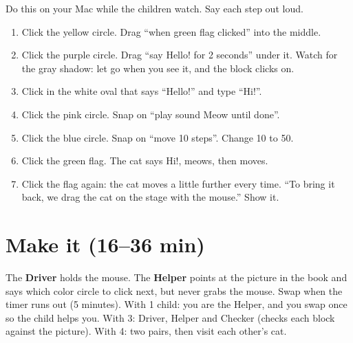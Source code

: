\begin{workedexample}
Do this on your Mac while the children watch. Say each step out loud.
\begin{enumerate}[leftmargin=1.4em,itemsep=1pt]
  \item Click the yellow  circle. Drag \enquote{when green flag clicked} into the middle.
  \item Click the purple  circle. Drag \enquote{say Hello! for 2 seconds} under it. Watch for the gray shadow: let go when you see it, and the block clicks on.
  \item Click in the white oval that says \enquote{Hello!} and type \enquote{Hi!}.
  \item Click the pink  circle. Snap on \enquote{play sound Meow until done}.
  \item Click the blue  circle. Snap on \enquote{move 10 steps}. Change 10 to 50.
  \item Click the green flag. The cat says Hi!, meows, then moves.
  \item Click the flag again: the cat moves a little further every time. \enquote{To bring it back, we drag the cat on the stage with the mouse.} Show it.
\end{enumerate}
\begin{center}
\begin{scratch}[scale=0.85]
\end{scratch}
\end{center}
\end{workedexample}

\section{Make it (16--36 min)}
\begin{pairroles}
The \textbf{Driver} holds the mouse. The \textbf{Helper} points at the picture in the book and says which color circle to click next, but never grabs the mouse. Swap when the timer runs out (5 minutes). With 1 child: you are the Helper, and you swap once so the child helps you. With 3: Driver, Helper and Checker (checks each block against the picture). With 4: two pairs, then visit each other's cat.
\end{pairroles}

